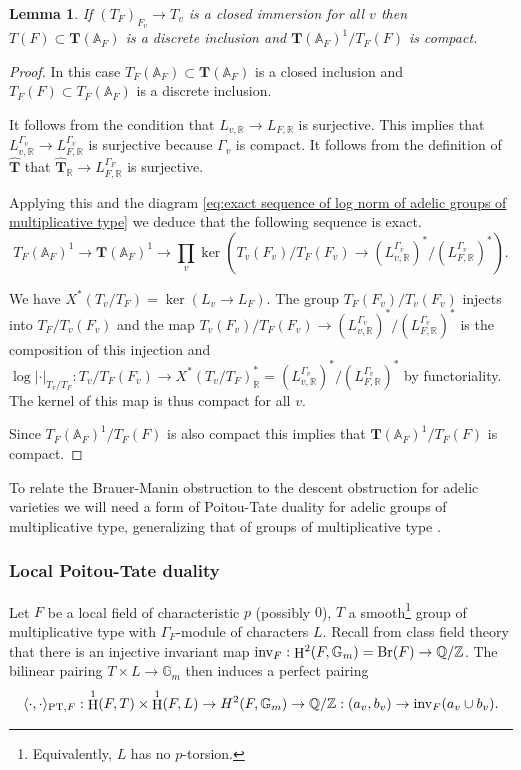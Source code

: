 \documentclass[a4paper,11pt,reqno]{amsart}
\newcommand{\Q}{\mathbb{Q}}
\newcommand{\R}{\mathbb{R}}
\newcommand{\G}{\mathbb{G}}
\newcommand{\A}{\mathbb{A}}
\DeclareMathOperator{\Br}{Br}
\DeclareMathOperator{\HH}{H}
\newtheorem{lemma}[theorem]{Lemma}
\theoremstyle{definition}
\begin{document}
\begin{lemma}\label{lem: Quotient is compact}
	If $(T_F)_{F_v} \to T_v$ is a closed immersion for all $v$ then $T(F) \subset \mathbf{T}(\A_F)$ is a discrete inclusion and $\mathbf{T}(\A_F)^1/ T_F(F)$ is compact.
\end{lemma}
\begin{proof}
	In this case $T_F(\A_F) \subset \mathbf{T}(\A_F)$ is a closed inclusion and $T_F(F) \subset T_F(\A_F)$ is a discrete inclusion.
	
	It follows from the condition that $L_{v, \R} \to L_{F, \R}$ is surjective. This implies that $L_{v, \R}^{\Gamma_v} \to L_{F, \R}^{\Gamma_v}$ is surjective because $\Gamma_v$ is compact. It follows from the definition of $\hat{\mathbf{T}}$ that $\hat{\mathbf{T}}_{\R} \to L_{F, \R}^{\Gamma_F}$ is surjective.
	
	Applying this and the diagram \eqref{eq:exact sequence of log norm of adelic groups of multiplicative type} we deduce that the following sequence is exact.
	\[
	T_F(\A_F)^1 \to \mathbf{T}(\A_F)^1 \to \prod_v\ker\left(T_v(F_v)/T_F(F_v) \to (L_{v, \R}^{\Gamma_v})^*/(L_{F, \R}^{\Gamma_v})^*\right).
	\]
	
	We have $X^*(T_v/T_F) = \ker(L_v \to L_F)$. The group $T_F(F_v)/T_v(F_v)$ injects into $T_F/T_v(F_v)$ and the map $T_v(F_v)/T_F(F_v) \to (L_{v, \R}^{\Gamma_v})^*/(L_{F, \R}^{\Gamma_v})^*$ is the composition of this injection and $\log |\cdot|_{T_v/T_F}: T_v/T_F(F_v) \to X^*(T_v/T_F)_{\R}^* = (L_{v, \R}^{\Gamma_v})^*/(L_{F, \R}^{\Gamma_v})^*$ by functoriality. The kernel of this map is thus compact for all $v$.
	
	Since $T_F(\A_F)^1/T_F(F)$ is also compact this implies that $\mathbf{T}(\A_F)^1/T_F(F)$ is compact.
\end{proof}

To relate the Brauer-Manin obstruction to the descent obstruction for adelic varieties we will need a form of Poitou-Tate duality for adelic groups of multiplicative type, generalizing that of groups of multiplicative type \cite{Milne2006Duality}.
\subsubsection{Local Poitou-Tate duality}
Let $F$ be a local field of characteristic $p$ (possibly $0$), $T$ a smooth\footnote{Equivalently, $L$ has no $p$-torsion.} group of multiplicative type with $\Gamma_F$-module of characters $L$. Recall from class field theory that there is an injective invariant map $\text{inv}_{F}: \HH^2(F, \G_m) = \Br(F) \to \Q/\Z$. The bilinear pairing $T \times L \to \G_m$ then induces a perfect pairing \cite[Cor. 2.3,Thm. 2.13]{Milne2006Duality}
\begin{equation}
	\langle \cdot, \cdot \rangle_{\text{PT}, F}: \HH^1(F, T) \times \HH^1(F, L) \to H^2(F, \G_m) \to \Q/\Z: (a_v, b_v) \to \text{inv}_{F}(a_v \cup b_v).
	\label{Local Poitou-Tate duality}
\end{equation}
\end{document}
